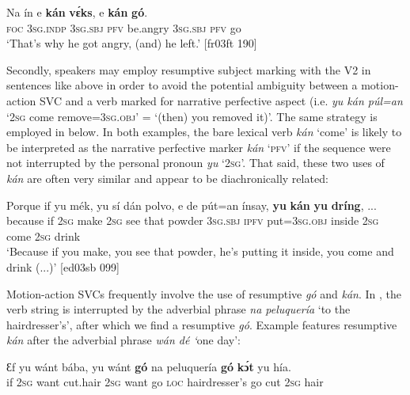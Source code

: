 \ea%
    \label{ex:key:1554}
    \gll   Na  ín    e    \textbf{kán}  \textbf{vɛ́ks},    e    \textbf{kán}  \textbf{gó}.\\
\textsc{foc}  \textsc{3sg.indp}  \textsc{3sg.sbj}  \textsc{pfv}  be.angry    \textsc{3sg.sbj}  \textsc{pfv}  go\\

\glt ‘That’s why he got angry, (and) he left.’ [fr03ft 190]
\z

Secondly, speakers may employ resumptive subject marking with the V2 in sentences like  above in order to avoid the potential ambiguity between a motion-action SVC and a verb marked for narrative perfective aspect (i.e. \textit{yu kán púl=an} ‘\textsc{2sg} come remove=\textsc{3sg.obj}’ = ‘(then) you removed it)’. The same strategy is employed in  below. In both examples, the bare lexical verb \textit{kán} ‘come’ is likely to be interpreted as the narrative perfective marker \textit{kán} ‘\textsc{pfv’} if the sequence were not interrupted by the personal pronoun \textit{yu} ‘\textsc{2sg}’. That said, these two uses of \textit{kán} are often very similar and appear to be diachronically related:


\ea%
    \label{ex:key:1555}
    \gll Porque  if  yu  mék,  yu  sí  dán  polvo,  e    de
pút=an    ínsay,  \textbf{yu}  \textbf{kán}    \textbf{yu}  \textbf{dríng},  \op...\cp{}\\
because  if  \textsc{2sg}  make  \textsc{2sg}  see  that  powder  \textsc{3sg.sbj}  \textsc{ipfv}
put=\textsc{3sg.obj}  inside  \textsc{2sg}  come  \textsc{2sg}  drink\\

\glt ‘Because if you make, you see that powder, he’s putting it inside, 
you come and drink (...)’ [ed03sb 099]
\z

Motion-action SVCs frequently involve the use of resumptive \textit{gó} and \textit{kán}. In , the verb string is interrupted by the adverbial phrase \textit{na peluquería} ‘to the hairdresser’s’, after which we find a resumptive \textit{gó}. Example  features resumptive \textit{kán} after the adverbial phrase \textit{wán dé ‘}one day’: 


\ea%
    \label{ex:key:1556}
    \gll Ɛf  yu  wánt bába,  yu  wánt  \textbf{gó}  na  peluquería  \textbf{gó}  \textbf{kɔ́t}  yu  hía.\\
if  \textsc{2sg}  want  cut.hair  \textsc{2sg}  want  go  \textsc{loc}  hairdresser’s  go  cut  \textsc{2sg}  hair\\

